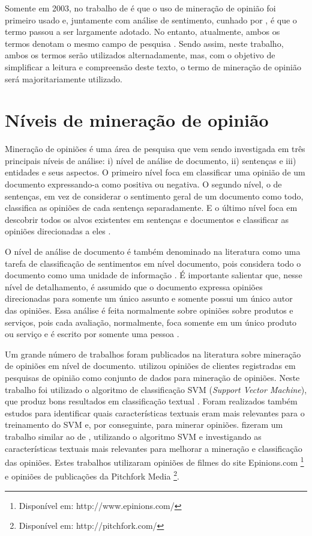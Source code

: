 \documentclass[template.tex]{subfiles}
\begin{document}
Somente em 2003, no trabalho de  é que o uso de mineração de opinião foi primeiro usado e, juntamente com análise de sentimento, cunhado por , é que o termo passou a ser largamente adotado. No entanto, atualmente, ambos os termos denotam o mesmo campo de pesquisa \cite{bing:2012, pang:2008}. Sendo assim, neste trabalho, ambos os termos serão utilizados alternadamente, mas, com o objetivo de simplificar a leitura e compreensão deste texto, o termo de mineração de opinião será majoritariamente utilizado.

\section{Níveis de mineração de opinião}

Mineração de opiniões é uma área de pesquisa que vem sendo investigada em três principais níveis de análise: i) nível de análise de documento, ii) sentenças e iii) entidades e seus aspectos. O primeiro nível foca em classificar uma opinião de um documento expressando-a como positiva ou negativa. O segundo nível, o de sentenças, em vez de considerar o sentimento geral de um documento como todo, classifica as opiniões de cada sentença separadamente. E o último nível foca em descobrir todos os alvos existentes em sentenças e documentos e classificar as opiniões direcionadas a eles \cite{bing:2012}.

O nível de análise de documento é também denominado na literatura como uma tarefa de classificação de sentimentos em nível documento, pois considera todo o documento como uma unidade de informação \cite{bing:2012, pang:2008}. É importante salientar que, nesse nível de detalhamento, é assumido que o documento expressa opiniões direcionadas para somente um único assunto e somente possui um único autor das opiniões. Essa análise é feita normalmente sobre opiniões sobre produtos e serviços, pois cada avaliação, normalmente, foca somente em um único produto ou serviço e é escrito por somente uma pessoa \cite{bing:2012}.

Um grande número de trabalhos foram publicados na literatura sobre mineração de opiniões em nível de documento.  utilizou opiniões de clientes registradas em pesquisas de opinião como conjunto de dados para mineração de opiniões. Neste trabalho foi utilizado o algoritmo de classificação SVM (\textit{Support Vector Machine}), que produz bons resultados em classificação textual \cite{joachims1998text}. Foram realizados também estudos para identificar quais características textuais eram mais relevantes para o treinamento do SVM e, por conseguinte, para minerar opiniões. \cite{mullen2004sentiment} fizeram um trabalho similar ao de , utilizando o algoritmo SVM e investigando as características textuais mais relevantes para melhorar a mineração e classificação das opiniões. Estes trabalhos utilizaram opiniões de filmes do site Epinions.com \footnote{Disponível em: http://www.epinions.com/} e opiniões de publicações da Pitchfork Media \footnote{Disponível em: http://pitchfork.com/}.
\end{document}
